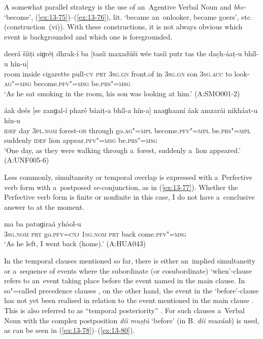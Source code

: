 A somewhat parallel strategy is the use of an~Agentive Verbal Noun and \textit{bhe-} `become', (\ref{ex:13-75})--(\ref{ex:13-76}), lit. `became an~onlooker, became goers', etc. (construction~(vi)). With these constructions, it is not always obvious which event is backgrounded and which one is foregrounded. 

\begin{exe}
\ex
\label{ex:13-75}
\gll deerá šíiṭi siɡréṭ dhrak-í ba [tasíi maxadúši wée tasíi putr tas the dac̣h-áaṭ-u bhíl-u hín-u] \\
room inside cigarette pull-\textsc{cv} \textsc{prt} \textsc{3sg.gn} front.of in \textsc{3sg.gn}  son \textsc{3sg.acc} to look-\textsc{ag"=msg} become.\textsc{pfv"=msg} be.\textsc{prs"=msg}  \\
\glt `As he sat smoking in the room, his son was looking at him.' (A:SMO001-2)

\ex
\label{ex:13-76}
\gll áak deés [se zanɡal-í pharé báaiṭ-a bhíl-a hín-a] naaɡhaaní áak amzarái nikháat-u hín-u \\
\textsc{idef} day \textsc{3pl.nom} forest-\textsc{ob} through go.\textsc{ag"=mpl}  become.\textsc{pfv"=mpl} be.\textsc{prs"=mpl} suddenly \textsc{idef} lion appear.\textsc{pfv"=msg} be.\textsc{prs"=msg}  \\
\glt `One day, as they were walking through a~forest, suddenly a~lion appeared.' (A:UNF005-6) 
\end{exe}

Less commonly, simultaneity or temporal overlap is expressed with a~Perfective verb form with a~postposed \textit{ee}-conjunction, as in (\ref{ex:13-77}). Whether the Perfective verb form is finite or nonfinite in this case, I do not have a~conclusive answer to at the moment.

\begin{exe}
\ex
\label{ex:13-77}
\gll [so ta ɡúum=ee] ma ba patuɡiraá yhóol-u \\
\textsc{3sg.nom} \textsc{prt} go.\textsc{pfv=cnj} \textsc{1sg.nom} \textsc{prt} back  come.\textsc{pfv"=msg} \\
\glt `As he left, I went back (home).' (A:HUA043) 
\end{exe}

 In the temporal clauses mentioned so far, there is either an~implied simultaneity or a~sequence of events where the subordinate (or cosubordinate) `when'-clause refers to an~event taking place before the event named in the main clause. In so"=called precedence clauses \citep[327]{givon2001b}, on the other hand, the event in the `before'-clause has not yet been realised in relation to the event mentioned in the main clause \citep[247--248]{thompsonetal2007}. This is also referred to as ``temporal posteriority'' \citep[159]{cristofaro2005}. For such clauses a~Verbal Noun with the complex postposition \textit{díi muṣṭú} `before' (in B. \textit{díi muxáak}) is used, as can be seen in (\ref{ex:13-78})--(\ref{ex:13-80}).

